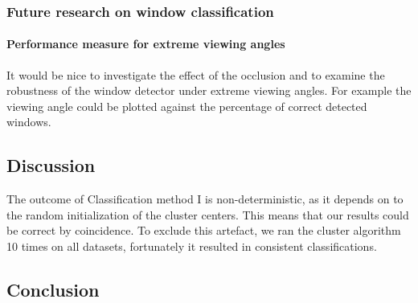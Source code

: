 \subsubsection{Future research on window classification} 
\paragraph{Performance measure for extreme viewing angles}
It would be nice to investigate the effect of the occlusion and to examine the
robustness of the window detector under extreme viewing angles.
For example the viewing angle could be plotted against the percentage of
correct detected windows.







\subsection{Discussion}  %
The outcome of Classification method I is non-deterministic, as it depends on to the
random initialization of the cluster centers. This means that our results could be correct by
coincidence.  To exclude this artefact, we ran the cluster algorithm 10 times
on all datasets, fortunately it resulted in consistent classifications.






\subsection{Conclusion}



